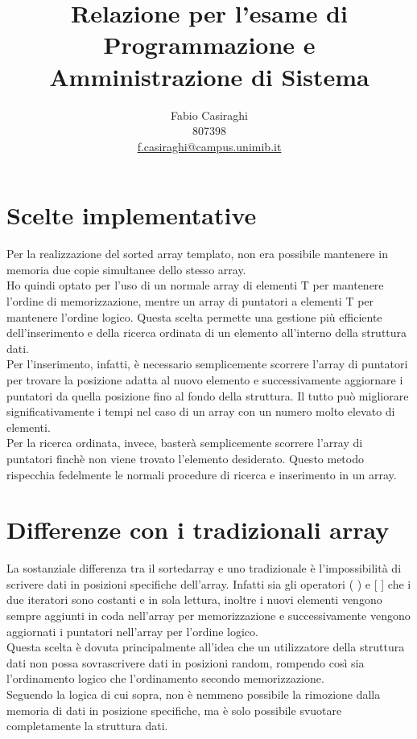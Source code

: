 \documentclass[11pt]{article}
\author{Fabio Casiraghi \\807398 \\ \href{mailto:f.casiraghi@campus.unimib.it} {f.casiraghi@campus.unimib.it}}
\title{Relazione per l'esame di Programmazione e Amministrazione di Sistema}
\begin{document}
\maketitle
\vspace{2cm}

\section*{Scelte implementative}
Per la realizzazione del sorted array templato, non era possibile mantenere in memoria
due copie simultanee dello stesso array. \\
Ho quindi optato per l'uso di un normale array di elementi T per mantenere l'ordine di memorizzazione,
mentre un array di puntatori a elementi T per mantenere l'ordine logico. Questa scelta permette
una gestione più efficiente dell'inserimento e della ricerca ordinata di un elemento all'interno della
struttura dati.\\
Per l'inserimento, infatti, è necessario semplicemente scorrere l'array di puntatori per trovare la 
posizione adatta al nuovo elemento e successivamente aggiornare i puntatori da quella posizione fino al fondo
della struttura. Il tutto può migliorare significativamente i tempi nel caso di un array 
con un numero molto elevato di elementi.\\
Per la ricerca ordinata, invece, basterà semplicemente scorrere l'array di puntatori finchè non viene 
trovato l'elemento desiderato. Questo metodo rispecchia fedelmente le normali procedure di ricerca e inserimento 
in un array.
\section*{Differenze con i tradizionali array}
La sostanziale differenza tra il sortedarray e uno tradizionale è l'impossibilità di scrivere dati in posizioni specifiche dell'array. Infatti sia gli operatori ( ) e [ ] che i due iteratori sono costanti e in sola lettura, inoltre i nuovi elementi vengono sempre aggiunti in coda nell'array per memorizzazione e successivamente vengono aggiornati i puntatori nell'array per l'ordine logico.\\
Questa scelta è dovuta principalmente all'idea che un utilizzatore della struttura dati non possa sovrascrivere dati in posizioni random, rompendo così sia l'ordinamento logico che l'ordinamento secondo memorizzazione.\\
Seguendo la logica di cui sopra, non è nemmeno possibile la rimozione dalla memoria di dati in posizione specifiche, ma è solo possibile svuotare completamente la struttura dati.
\end{document}
